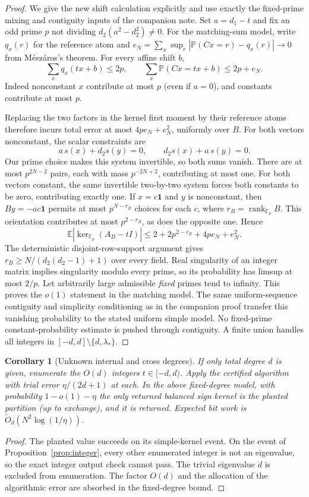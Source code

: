 \documentclass[11pt]{article}
\newtheorem{corollary}[theorem]{Corollary}
\newcommand{\F}{\mathbb F}
\newcommand{\one}{\boldsymbol 1}
\newcommand{\rank}{\operatorname{rank}}
\newcommand{\E}{\mathbb E}
\newcommand{\Prob}{\mathbb P}
\begin{document}
\begin{proof}
We give the new shift calculation explicitly and use exactly the
fixed-prime mixing and contiguity inputs of the companion note.
Set $a=d_1-t$ and fix an odd prime $p$ not dividing
$d_2(a^2-d_2^2)\ne0$.
For the matching-sum model, write $q_x(r)$ for the reference atom
and $e_N=\sum_x\sup_r|\Prob(Cx=r)-q_x(r)|\to0$ from
M\'esz\'aros's theorem. For every affine shift $b$,
\[
 \sum_xq_x(tx+b)\le2p,\qquad
 \sum_x\Prob(Cx=tx+b)\le2p+e_N.
\]
Indeed nonconstant $x$ contribute at most $p$ (even if $a=0$),
and constants contribute at most $p$.

Replacing the two factors in the kernel first moment by their
reference atoms therefore incurs total error at most
$4p e_N+e_N^2$, uniformly over $B$.
For both vectors nonconstant, the scalar constraints are
\[
 a\,s(x)+d_2s(y)=0,\qquad d_2s(x)+a\,s(y)=0.
\]
Our prime choice makes this system invertible, so both sums vanish.
There are at most $p^{2N-2}$ pairs, each with mass $p^{-2N+2}$,
contributing at most one. For both vectors constant, the same
invertible two-by-two system forces both constants to be zero,
contributing exactly one. If $x=c\one$ and $y$ is nonconstant,
then $By=-ac\one$ permits at most $p^{N-r_B}$ choices for each
$c$, where $r_B=\rank_{\F_p}B$. This orientation contributes at
most $p^{2-r_B}$, as does the opposite one. Hence
\[
 \E|\ker_{\F_p}(A_B-tI)|
 \le2+2p^{2-r_B}+4p e_N+e_N^2.
\]
The deterministic disjoint-row-support argument gives
$r_B\ge N/(d_2(d_2-1)+1)$ over every field.
Real singularity of an integer matrix implies singularity modulo
every prime, so its probability has limsup at most $2/p$.
Let arbitrarily large admissible \emph{fixed} primes tend to infinity.
This proves the $o(1)$ statement in the matching model. The same
uniform-sequence contiguity and simplicity conditioning as in the
companion proof transfer this vanishing probability to the stated
uniform simple model. No fixed-prime constant-probability estimate
is pushed through contiguity. A finite union handles all integers
in $[-d,d]\setminus\{d,\lambda_*\}$.
\end{proof}

\begin{corollary}[Unknown internal and cross degrees]\label{cor:unknown}
If only total degree $d$ is given, enumerate the $O(d)$ integers
$t\in[-d,d)$. Apply the certified algorithm with trial error
$\eta/(2d+1)$ at each. In the above fixed-degree model, with
probability $1-o(1)-\eta$ the only returned balanced sign kernel
is the planted partition (up to exchange), and it is returned.
Expected bit work is
$\widetilde O_d(N^2\log(1/\eta))$.
\end{corollary}
\begin{proof}
The planted value succeeds on its simple-kernel event. On the event
of Proposition~\ref{prop:integer}, every other enumerated integer
is not an eigenvalue, so the exact integer output check cannot pass.
The trivial eigenvalue $d$ is excluded from enumeration.
The factor $O(d)$ and the allocation of the algorithmic error are
absorbed in the fixed-degree bound.
\end{proof}
\end{document}
